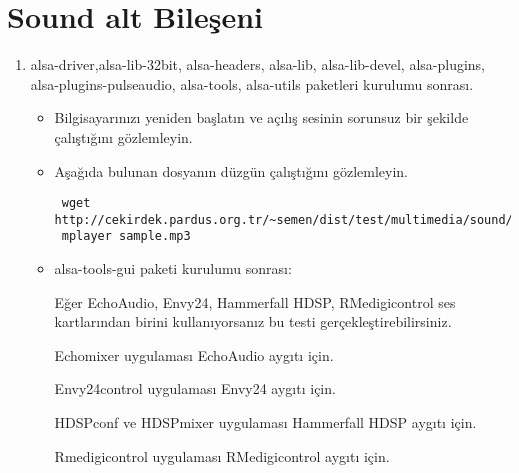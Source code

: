 \documentclass[a4paper,10pt]{article}
\begin{document}
\section{Sound alt Bileşeni}
\begin{enumerate}
 \item alsa-driver,alsa-lib-32bit, alsa-headers, alsa-lib, alsa-lib-devel, alsa-plugins, alsa-plugins-pulseaudio, alsa-tools, alsa-utils paketleri kurulumu sonrası.
\begin{itemize}
 \item Bilgisayarınızı yeniden başlatın ve açılış sesinin sorunsuz bir şekilde çalıştığını gözlemleyin.
 \item Aşağıda bulunan dosyanın düzgün çalıştığını gözlemleyin.
\begin{verbatim}
 wget http://cekirdek.pardus.org.tr/~semen/dist/test/multimedia/sound/sound/sample.mp3
 mplayer sample.mp3
\end{verbatim}

\item alsa-tools-gui paketi kurulumu sonrası:

Eğer  EchoAudio, Envy24, Hammerfall HDSP, RMedigicontrol ses kartlarından birini kullanıyorsanız bu testi gerçekleştirebilirsiniz.

Echomixer uygulaması EchoAudio aygıtı için.

Envy24control uygulaması Envy24 aygıtı için.

HDSPconf ve HDSPmixer uygulaması Hammerfall HDSP aygıtı için.

Rmedigicontrol uygulaması RMedigicontrol aygıtı için.
\end{itemize}


\end{enumerate}
\end{document}
